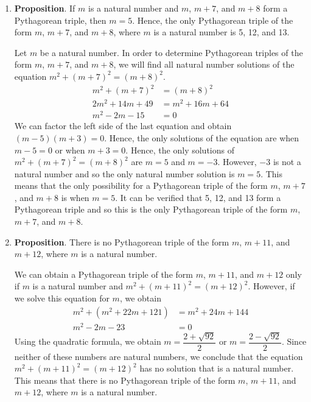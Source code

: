 \documentclass[11pt]{article}
\begin{document}
\begin{enumerate}
  \item \textbf{Proposition}.  If $m$ is a natural number and $m$, $m + 7$, and $m + 8$ form a Pythagorean triple, then $m = 5$.  Hence, the only Pythagorean triple of the form $m$, $m + 7$, and $m + 8$, where $m$ is a natural number is 5, 12, and 13.
\begin{myproof}
Let $m$ be a natural number.  In order to determine Pythagorean triples of the form $m$, $m + 7$, and $m + 8$, we will find all natural number solutions of the equation $m^2 + (m + 7)^2 = (m + 8)^2$.
\begin{align*}
m^2 + (m + 7)^2 &= (m + 8)^2 \\
2m^2 + 14m + 49 &= m^2 + 16m + 64 \\
m^2 - 2m - 15 &= 0 
\end{align*}
We can factor the left side of the last equation and obtain $(m - 5)(m + 3) = 0$. Hence, the only solutions of the equation are when $m - 5 = 0$ or when $m + 3 = 0$.  Hence, the only solutions of 
$m^2 + (m + 7)^2 = (m + 8)^2$ are $m = 5$ and $m = -3$.  However, $-3$ is not a natural number and so the only natural number solution is $m = 5$.  This means that the only possibility for a Pythagorean triple of the form $m$, $m + 7$, and $m + 8$ is when $m = 5$.  It can be verified that 5, 12, and 13 form a Pythagorean triple and so this is the only Pythagorean triple of the form $m$, $m + 7$, and $m + 8$.
\end{myproof}


  \item \textbf{Proposition}.  There is no Pythagorean triple of the form $m$, $m + 11$, and $m + 12$, where $m$ is a natural number.

\begin{myproof}
We can obtain a Pythagorean triple of the form $m$, $m + 11$, and $m + 12$ only if $m$ is a natural number and $m^2 + (m + 11)^2 = (m + 12)^2$.  However, if we solve this equation for $m$, we obtain
\begin{align*}
m^2 + \left( m^2 + 22m + 121 \right) &= m^2 + 24m + 144 \\
m^2 - 2m - 23 &= 0
\end{align*}
Using the quadratic formula, we obtain $m = \dfrac{2 + \sqrt{92}}{2}$ or $m = \dfrac{2 - \sqrt{92}}{2}$.  Since neither of these numbers are natural numbers, we conclude that the equation 
$m^2 + (m + 11)^2 = (m + 12)^2$ has no solution that is a natural number.  This means that there is no Pythagorean triple of the form $m$, $m + 11$, and $m + 12$, where $m$ is a natural number.
\end{myproof}

\end{enumerate}
\end{document}

